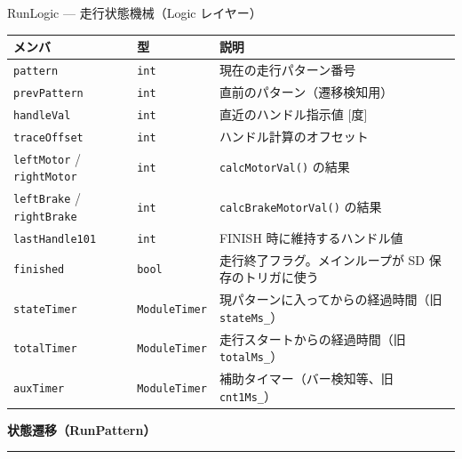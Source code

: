 \documentclass[a4paper,11pt,dvipdfmx]{jsarticle}
\makeatletter
\newcommand{\apisection}[1]{%
  \par\addvspace{4mm}%
  {\normalsize\bfseries\color{headerblue} #1}%
  \par\vspace{-1mm}%
  {\color{accentblue!40}\rule{\linewidth}{0.5pt}}%
  \par\nobreak\vspace{2mm}%
  \@afterheading
}
\makeatother
\begin{document}
\begin{apibox}{RunLogic --- 走行状態機械（Logic レイヤー）}
\begin{tabularx}{\textwidth}{l l X}
\toprule
\textbf{メンバ} & \textbf{型} & \textbf{説明} \\
\midrule
\texttt{pattern}       & \texttt{int}  & 現在の走行パターン番号 \\
\texttt{prevPattern}   & \texttt{int}  & 直前のパターン（遷移検知用） \\
\texttt{handleVal}     & \texttt{int}  & 直近のハンドル指示値 [度] \\
\texttt{traceOffset}   & \texttt{int}  & ハンドル計算のオフセット \\
\texttt{leftMotor} / \texttt{rightMotor} & \texttt{int} & \texttt{calcMotorVal()} の結果 \\
\texttt{leftBrake} / \texttt{rightBrake} & \texttt{int} & \texttt{calcBrakeMotorVal()} の結果 \\
\texttt{lastHandle101} & \texttt{int}  & FINISH 時に維持するハンドル値 \\
\texttt{finished}      & \texttt{bool} & 走行終了フラグ。メインループが SD 保存のトリガに使う \\
\texttt{stateTimer}    & \texttt{ModuleTimer} & 現パターンに入ってからの経過時間（旧 \texttt{stateMs\_}） \\
\texttt{totalTimer}    & \texttt{ModuleTimer} & 走行スタートからの経過時間（旧 \texttt{totalMs\_}） \\
\texttt{auxTimer}      & \texttt{ModuleTimer} & 補助タイマー（バー検知等、旧 \texttt{cnt1Ms\_}） \\
\bottomrule
\end{tabularx}

\apisection{状態遷移（RunPattern）}


\end{apibox}
\end{document}
